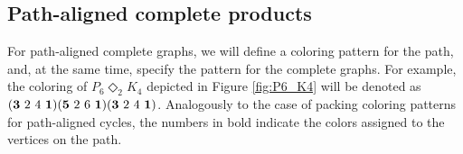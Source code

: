 \documentclass{article}
\newtheorem{question}{Question}
\begin{document}






\subsection{Path-aligned complete products}
\label{subsec:complete}
For path-aligned complete graphs, we will define a coloring pattern for the path, and, at the same time, specify the pattern for the complete graphs. For example, the coloring of $P_6 \Diamond_2 K_4$ depicted in Figure \ref{fig:P6_K4} will be denoted as $({\bf 3}\ 2\ 4\ {\bf 1})({\bf 5}\ 2\ 6\ {\bf 1})({\bf 3}\ 2\ 4\ {\bf 1})$. Analogously to the case of packing coloring patterns for path-aligned cycles, the numbers in bold indicate the colors assigned to the vertices on the path.

\end{document}
